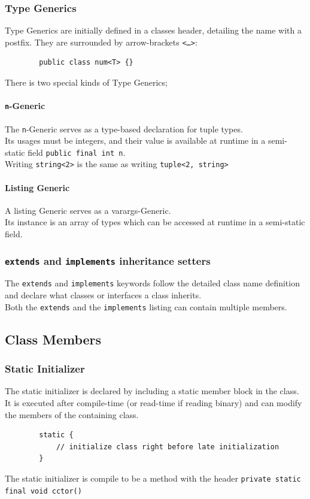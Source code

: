\documentclass{docs}
\begin{document}
    \subsubsection{Type Generics}
    Type Generics are initially defined in a classes header, detailing the name with a postfix.
    They are surrounded by arrow-brackets \texttt{<\dots>}:
    \begin{verbatim}
        public class num<T> {}
    \end{verbatim}
    There is two special kinds of Type Generics;
    
    \label{typeGenN}
    \paragraph{\texttt{n}-Generic} The \texttt{n}-Generic serves as a type-based declaration for tuple types. \\
    Its usages must be integers, and their value is available at runtime in a semi-static field \texttt{public final int n}. \\
    Writing \texttt{string<2>} is the same as writing \texttt{tuple<2, string>}
    
    \label{typeGenList}
    \paragraph{Listing Generic} A listing Generic serves as a varargs-Generic. \\
    Its instance is an array of types which can be accessed at runtime in a semi-static field.
    
    \subsubsection{\texttt{extends} and \texttt{implements} inheritance setters}
    The \texttt{extends} and \texttt{implements} keywords follow the detailed class name definition and declare what classes or interfaces a class inherits. \\
    Both the \texttt{extends} and the \texttt{implements} listing can contain multiple members.
    
    \subsection{Class Members}
    
    \subsubsection{Static Initializer}
    The static initializer is declared by including a static member block in the class. \\
    It is executed after compile-time (or read-time if reading binary) and can modify the members of the containing class.
    \begin{verbatim}
        static {
            // initialize class right before late initialization
        }
    \end{verbatim}
    The static initializer is compile to be a method with the header \texttt{private static final void cctor()}
    
\end{document}
